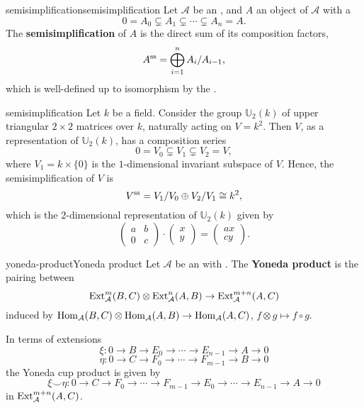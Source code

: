 \begin{topic}{semisimplification}{semisimplification}
    Let $\mathcal{A}$ be an , and $A$ an object of $\mathcal{A}$ with a 
    \[ 0 = A_0 \subsetneq A_1 \subsetneq \cdots \subsetneq A_n = A . \]
    The \textbf{semisimplification} of $A$ is the direct sum of its composition factors,
    \[ A^\textup{ss} = \bigoplus_{i = 1}^{n} A_i / A_{i - 1} , \]
    which is well-defined up to isomorphism by the .
\end{topic}

\begin{example}{semisimplification}
    Let $k$ be a field. Consider the group $\mathbb{U}_2(k)$ of upper triangular $2 \times 2$ matrices over $k$, naturally acting on $V = k^2$. Then $V$, as a representation of $\mathbb{U}_2(k)$, has a composition series
    \[ 0 = V_0 \subsetneq V_1 \subsetneq V_2 = V , \]
    where $V_1 = k \times \{ 0 \}$ is the $1$-dimensional invariant subspace of $V$. Hence, the semisimplification of $V$ is
    \[ V^\textup{ss} = V_1/V_0 \oplus V_2/V_1 \cong k^2 , \]
    which is the $2$-dimensional representation of $\mathbb{U}_2(k)$ given by
    \[ \begin{pmatrix} a & b \\ 0 & c \end{pmatrix} \cdot \begin{pmatrix} x \\ y \end{pmatrix} = \begin{pmatrix} a x \\ c y \end{pmatrix} . \]
\end{example}

\begin{topic}{yoneda-product}{Yoneda product}
    Let $\mathcal{A}$ be an  with . The \textbf{Yoneda product} is the pairing between 
    \[ \textup{Ext}_\mathcal{A}^m(B, C) \otimes \textup{Ext}_\mathcal{A}^n(A, B) \to \textup{Ext}_\mathcal{A}^{m + n}(A, C) \]
    induced by $\operatorname{Hom}_\mathcal{A}(B, C) \otimes \operatorname{Hom}_\mathcal{A}(A, B) \to \operatorname{Hom}_\mathcal{A}(A, C)$, $f \otimes g \mapsto f \circ g$.
    
    In terms of extensions
    \[ \xi : 0 \to B \to E_0 \to \cdots \to E_{n - 1} \to A \to 0 \]
    \[ \eta : 0 \to C \to F_0 \to \cdots \to F_{m - 1} \to B \to 0 \]
    the Yoneda cup product is given by
    \[ \xi \smile \eta : 0 \to C \to F_0 \to \cdots \to F_{m - 1} \to E_0 \to \cdots \to E_{n - 1} \to A \to 0 \]
    in $\textup{Ext}_\mathcal{A}^{m + n}(A, C)$.
\end{topic}

